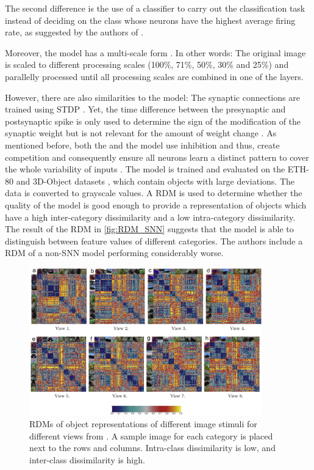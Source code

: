 The second difference is the use of a classifier to carry out the classification task 
instead of deciding on the class whose neurons have the highest average firing rate, 
as suggested by the authors of \cite{SNN}.

Moreover, the model has a multi-scale form \cite{multi_scale_STDP}.
In other words: 
The original image is scaled to different processing scales (100\%, 71\%, 50\%, 30\% and 25\%) and parallelly processed until 
all processing scales are combined in one of the layers.

However, there are also similarities to the \cite{SNN} model:
The synaptic connections are trained using \ac{STDP} \cite{multi_scale_STDP,STDP_vis_feat}.
Yet, the time difference between the presynaptic and postsynaptic spike is only used to determine the sign of the modification of the synaptic weight 
but is not relevant for the amount of weight change \cite{STDP_vis_feat}.
As mentioned before, both the \cite{multi_scale_STDP} and the \cite{SNN} model use inhibition and thus, 
create competition and consequently ensure all neurons learn a distinct pattern to cover the whole variability of inputs \cite{STDP_vis_feat}.
%
The \cite{multi_scale_STDP} model is trained and evaluated on the ETH-80 and 3D-Object datasets \cite{multi_scale_STDP}, which contain objects with large deviations.
The data is converted to grayscale values.
A \ac{RDM} is used to determine whether the quality of the model is good enough to provide a representation of objects which have a high inter-category dissimilarity and a low intra-category dissimilarity.
The result of the \ac{RDM} in \autoref{fig:RDM_SNN} suggests that the model is able to distinguish between feature values of different categories.
The authors include a \ac{RDM} of a non-\ac{SNN} model performing considerably worse.
%
\begin{figure}[htbp]
    \center
    \includegraphics[width=0.9\textwidth]{pictures/inter_intra_category_dissimilarity.jpg}
    \caption{\acp{RDM} of object representations of different image stimuli for different views from \cite{multi_scale_STDP}.
    A sample image for each category is placed next to the rows and columns.
    Intra-class dissimilarity is low, and inter-class dissimilarity is high.}
    \label{fig:RDM_SNN}
\end{figure}
